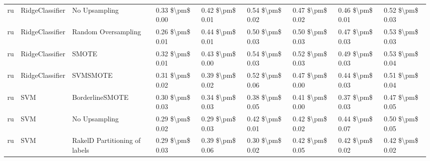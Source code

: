 \begin{tabular}{lllllllll}
      ru &                 RidgeClassifier &                 No Upsampling & 0.33 \$\textbackslash pm\$ 0.00 &           0.42 \$\textbackslash pm\$ 0.01 &       0.54 \$\textbackslash pm\$ 0.02 &        0.47 \$\textbackslash pm\$ 0.02 &                         0.46 \$\textbackslash pm\$ 0.01 &     0.52 \$\textbackslash pm\$ 0.03 \\
      ru &                 RidgeClassifier &           Random Oversampling & 0.26 \$\textbackslash pm\$ 0.01 &           0.44 \$\textbackslash pm\$ 0.01 &       0.50 \$\textbackslash pm\$ 0.03 &        0.50 \$\textbackslash pm\$ 0.03 &                         0.47 \$\textbackslash pm\$ 0.03 &     0.53 \$\textbackslash pm\$ 0.03 \\
      ru &                 RidgeClassifier &                         SMOTE & 0.32 \$\textbackslash pm\$ 0.01 &           0.43 \$\textbackslash pm\$ 0.00 &       0.54 \$\textbackslash pm\$ 0.03 &        0.52 \$\textbackslash pm\$ 0.03 &                         0.49 \$\textbackslash pm\$ 0.03 &     0.53 \$\textbackslash pm\$ 0.04 \\
      ru &                 RidgeClassifier &                      SVMSMOTE & 0.31 \$\textbackslash pm\$ 0.02 &           0.39 \$\textbackslash pm\$ 0.02 &       0.52 \$\textbackslash pm\$ 0.06 &        0.47 \$\textbackslash pm\$ 0.00 &                         0.44 \$\textbackslash pm\$ 0.03 &     0.51 \$\textbackslash pm\$ 0.04 \\
      ru &                             SVM &               BorderlineSMOTE & 0.30 \$\textbackslash pm\$ 0.03 &           0.34 \$\textbackslash pm\$ 0.03 &       0.38 \$\textbackslash pm\$ 0.05 &        0.41 \$\textbackslash pm\$ 0.00 &                         0.37 \$\textbackslash pm\$ 0.03 &     0.47 \$\textbackslash pm\$ 0.05 \\
      ru &                             SVM &                 No Upsampling & 0.29 \$\textbackslash pm\$ 0.02 &           0.29 \$\textbackslash pm\$ 0.03 &       0.42 \$\textbackslash pm\$ 0.01 &        0.42 \$\textbackslash pm\$ 0.02 &                         0.44 \$\textbackslash pm\$ 0.07 &     0.50 \$\textbackslash pm\$ 0.05 \\
      ru &                             SVM & RakelD Partitioning of labels & 0.29 \$\textbackslash pm\$ 0.03 &           0.39 \$\textbackslash pm\$ 0.06 &       0.30 \$\textbackslash pm\$ 0.02 &        0.42 \$\textbackslash pm\$ 0.05 &                         0.42 \$\textbackslash pm\$ 0.02 &     0.42 \$\textbackslash pm\$ 0.02 \\

\end{tabular}
